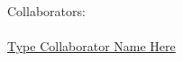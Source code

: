 {\normalsize \noindent Collaborators: \\ 
\\ \underline{ Type Collaborator Name Here        }} \\




